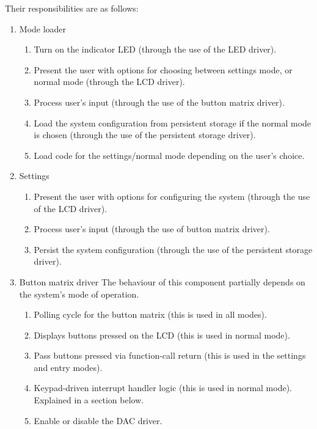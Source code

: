 \documentclass[11pt,a4paper
]{scrartcl}
\begin{document}
Their responsibilities are as follows:

\begin{enumerate}
   \item Mode loader
      \begin{enumerate}
         \item Turn on the indicator LED (through the use of the LED driver).
         \item Present the user with options for choosing between settings mode, or normal mode (through the LCD driver).
         \item Process user's input (through the use of the button matrix driver).
         \item Load the system configuration from persistent storage if the normal mode is chosen (through the use of the persistent storage driver).
         \item Load code for the settings/normal mode depending on the user's choice.
      \end{enumerate}

   \item Settings
      \begin{enumerate}
         \item Present the user with options for configuring the system (through the use of the LCD driver).
         \item Process user's input (through the use of button matrix driver).
         \item Persist the system configuration (through the use of the persistent storage driver).
      \end{enumerate}

   \item Button matrix driver
      The behaviour of this component partially depends on the system's mode of operation.   
      \begin{enumerate}
         \item Polling cycle for the button matrix (this is used in all modes).
         \item Displays buttons pressed on the LCD (this is used in normal mode).
         \item Pass buttons pressed via function-call return (this is used in the settings and entry modes).
         \item Keypad-driven interrupt handler logic (this is used in normal mode). Explained in a section below.
         \item Enable or disable the DAC driver.
      \end{enumerate}
   

\end{enumerate}
\end{document}
